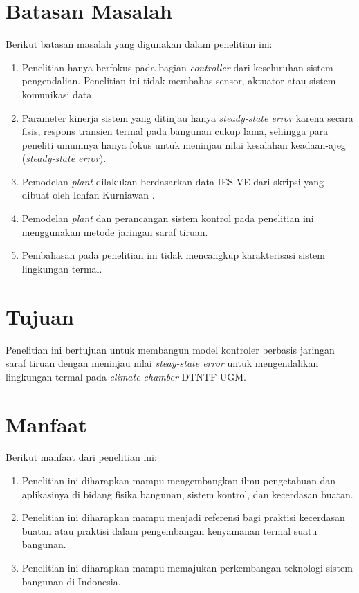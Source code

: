 \section{Batasan Masalah}
Berikut batasan masalah yang digunakan dalam penelitian ini:
\begin{enumerate}
	\item Penelitian hanya berfokus pada bagian \textit{controller} dari keseluruhan sistem pengendalian. Penelitian ini tidak membahas sensor, aktuator atau sistem komunikasi data.
	\item Parameter kinerja sistem yang ditinjau hanya \textit{steady-state error} karena secara fisis, respons transien termal pada bangunan cukup lama, sehingga para peneliti umumnya hanya fokus untuk meninjau nilai kesalahan keadaan-ajeg (\textit{steady-state error}).
	\item Pemodelan \textit{plant} dilakukan berdasarkan data IES-VE dari skripsi yang dibuat oleh Ichfan Kurniawan \cite{skripsiIchfan}.	
	\item Pemodelan \textit{plant} dan perancangan sistem kontrol pada penelitian ini menggunakan metode jaringan saraf tiruan.
	\item Pembahasan pada penelitian ini tidak mencangkup karakterisasi sistem lingkungan termal.
\end{enumerate}

\section{Tujuan}
Penelitian ini bertujuan untuk membangun model kontroler berbasis jaringan saraf tiruan dengan meninjau nilai \textit{steay-state error} untuk mengendalikan lingkungan termal pada \textit{climate chamber} DTNTF UGM.\\
\hfill\break

\section{Manfaat}
Berikut manfaat dari penelitian ini:
\begin{enumerate}
	\item Penelitian ini diharapkan mampu mengembangkan ilmu pengetahuan dan aplikasinya di bidang fisika bangunan, sistem kontrol, dan kecerdasan buatan.
	\item Penelitian ini diharapkan mampu menjadi referensi bagi praktisi kecerdasan buatan atau praktisi dalam pengembangan kenyamanan termal suatu bangunan.
	\item Penelitian ini diharapkan mampu memajukan perkembangan teknologi sistem bangunan di Indonesia.
\end{enumerate}


